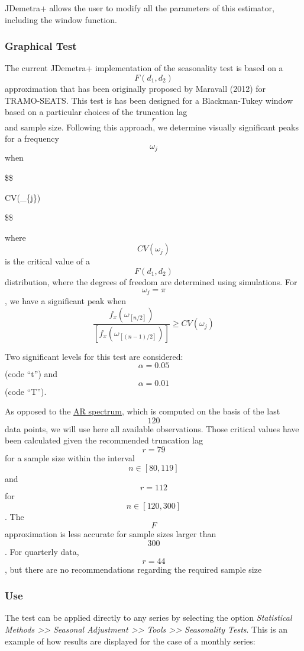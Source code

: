 \documentclass[
  letterpaper,
  DIV=11,
  numbers=noendperiod]{scrreprt}
\begin{document}
JDemetra+ allows the user to modify all the parameters of this
estimator, including the window function.

\hypertarget{graphical-test}{%
\subsubsection{Graphical Test}\label{graphical-test}}

The current JDemetra+ implementation of the seasonality test is based on
a \[F(d_{1},d_{2})\] approximation that has been originally proposed by
Maravall (2012) for TRAMO-SEATS. This test is has been designed for a
Blackman-Tukey window based on a particular choices of the truncation
lag \[r\] and sample size. Following this approach, we determine
visually significant peaks for a frequency \[\omega_{j}\] when

\$\$

\ge CV(\omega\_\{j\})

\$\$

where \[ CV(\omega_{j})\] is the critical value of a \[F(d_{1},d_{2})\]
distribution, where the degrees of freedom are determined using
simulations. For \[\omega_{j}= \pi\], we have a significant peak when
\[\frac{f_{x}(\omega_{[n/2]})}{\left[ f_{x}(\omega_{[(n-1)/2]})\right]} \ge CV(\omega_{j}) \]

Two significant levels for this test are considered: \[\alpha=0.05\]
(code ``t'') and \[\alpha=0.01\] (code ``T'').

As opposed to the
\href{\%7B\%7B\%20site.baseurl\%20\%7D\%7D/pages/theory/Tests_ARspectrum.html}{AR
spectrum}, which is computed on the basis of the last \[120\] data
points, we will use here all available observations. Those critical
values have been calculated given the recommended truncation lag
\[r=79\] for a sample size within the interval \[n \in [80,119]\] and
\[r=112\] for \[n \in [120,300]\] . The \[F\] approximation is less
accurate for sample sizes larger than \[300\]. For quarterly data,
\[r=44 \], but there are no recommendations regarding the required
sample size

\hypertarget{use}{%
\subsubsection{Use}\label{use}}

The test can be applied directly to any series by selecting the option
\emph{Statistical Methods \textgreater\textgreater{} Seasonal Adjustment
\textgreater\textgreater{} Tools \textgreater\textgreater{} Seasonality
Tests}. This is an example of how results are displayed for the case of
a monthly series:
\end{document}
